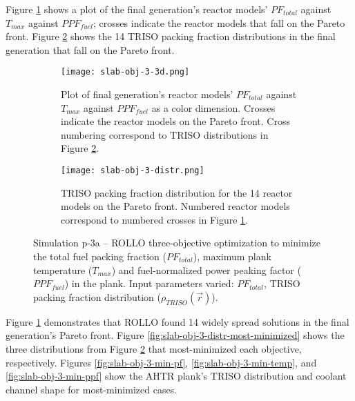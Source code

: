 Figure \ref{fig:slab-obj-3-3d} shows a plot of the final generation's reactor models' 
$PF_{total}$ against $T_{max}$ against $PPF_{fuel}$; crosses 
indicate the reactor models that fall on the Pareto front.
Figure \ref{fig:slab-obj-3-distr} shows the 14 TRISO packing fraction distributions in 
the final generation that fall on the Pareto front. 
\begin{figure}[htbp!]
    \begin{subfigure}{\textwidth}
        \centering
        \texttt{[image: slab-obj-3-3d.png]}
        \caption{Plot of final generation's reactor models' $PF_{total}$ against 
        $T_{max}$ against $PPF_{fuel}$ as a color dimension. 
        Crosses indicate the reactor models on the Pareto front. 
        Cross numbering correspond to TRISO distributions in Figure 
        \ref{fig:slab-obj-3-distr}.}
        \label{fig:slab-obj-3-3d} 
    \end{subfigure}
    \begin{subfigure}{\textwidth}
        \texttt{[image: slab-obj-3-distr.png]}
        \caption{TRISO packing fraction distribution for the 14 reactor models on the 
        Pareto front. Numbered reactor models correspond to numbered crosses in Figure 
        \ref{fig:slab-obj-3-3d}.}
        \label{fig:slab-obj-3-distr} 
    \end{subfigure}
    \caption{Simulation p-3a -- ROLLO three-objective optimization to minimize the total 
    fuel packing fraction ($PF_{total}$), maximum plank temperature ($T_{max}$) and 
    fuel-normalized power peaking factor ($PPF_{fuel}$) in the plank. 
    Input parameters varied: $PF_{total}$, TRISO packing fraction distribution
    ($\rho_{TRISO}(\vec{r})$).}
    \label{fig:slab-obj-3}
\end{figure}
Figure \ref{fig:slab-obj-3-3d} demonstrates that \gls{ROLLO} found 14 widely spread 
solutions in the final generation's Pareto front.  
Figure \ref{fig:slab-obj-3-distr-most-minimized} shows the three distributions from 
Figure \ref{fig:slab-obj-3-distr} that most-minimized each objective, respectively. 
Figures \ref{fig:slab-obj-3-min-pf}, \ref{fig:slab-obj-3-min-temp}, and 
\ref{fig:slab-obj-3-min-ppf} show the \gls{AHTR} plank's TRISO distribution and 
coolant channel shape for most-minimized cases. 
